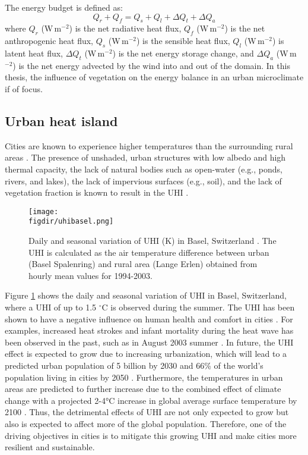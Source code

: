 The energy budget is defined as:
	\begin{equation}
	Q_r + Q_f = Q_s + Q_l + \Delta Q_t + \Delta Q_a
	\end{equation}
where $Q_r$ (W\,m$^{-2}$) is the net radiative heat flux, $Q_f$ (W\,m$^{-2}$) is the net anthropogenic heat flux, $Q_s$ (W\,m$^{-2}$) is the sensible heat flux, $Q_l$ (W\,m$^{-2}$) is latent heat flux, $\Delta Q_t$ (W\,m$^{-2}$) is the net energy storage change, and $\Delta Q_a$ (W\,m$^{-2}$) is the net energy advected by the wind into and out of the domain. In this thesis, the influence of vegetation on the energy balance in an urban microclimate if of focus. 

\subsection{Urban heat island}

Cities are known to experience higher temperatures than the surrounding rural areas \citep{Oke1973,Oke2017a}. The presence of unshaded, urban structures with low albedo and high thermal capacity, the lack of natural bodies such as open-water (e.g., ponds, rivers, and lakes), the lack of impervious surfaces (e.g., soil), and the lack of vegetation fraction is known to result in the UHI \citep{Bowler2010}. 
	
	\begin{figure}[t]
		\centering
		\texttt{[image: \\figdir/uhibasel.png]}
		\caption{Daily and seasonal variation of UHI (K) in Basel, Switzerland \citep{Parlow2014}. The UHI is calculated as the air temperature difference between urban (Basel Spalenring) and rural area (Lange Erlen) obtained from hourly mean values for 1994-2003.}
		\label{fig:uhibasel}
	\end{figure}

Figure \ref{fig:uhibasel} shows the daily and seasonal variation of UHI in Basel, Switzerland, where a UHI of up to 1.5 $^{\circ}$C is observed during the summer. The UHI has been shown to have a negative influence on human health and comfort in cities \citep{santamouris2001energy,Kovats2008,Salmond2016}. For examples, increased heat strokes and infant mortality during the heat wave has been observed in the past, such as in August 2003 summer \citep{Fouillet2006}. In future, the UHI effect is expected to grow due to increasing urbanization, which will lead to a predicted urban population of 5 billion by 2030 and 66\% of the world’s population living in cities by 2050 \citep{Seto2012, UnitedNations2015}. Furthermore, the temperatures in urban areas are predicted to further increase due to the combined effect of climate change with a projected 2-4\si{\celsius} increase in global average surface temperature by 2100 \citep{pachauri2014climate}. Thus, the detrimental effects of UHI are not only expected to grow but also is expected to affect more of the global population. Therefore, one of the driving objectives in cities is to mitigate this growing UHI and make cities more resilient and sustainable. 

